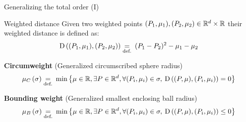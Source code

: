 \begin{frame}{Generalizing the total order (I)}
	
\scriptsize
\begin{block}{\scriptsize Weighted distance}
Given two weighted points $(P_1,\mu_1), (P_2,\mu_2) \in \mathbb{R}^d\times \mathbb{R}$ their weighted distance is defined as:
\[
\operatorname{D} \left( (P_1,\mu_1), (P_2,\mu_2) \right) \underset{\text{def.}}{=} \: (P_1-P_2)^2 - \mu_1 - \mu_2 
\]
\end{block}

\textbf{Circumweight} (Generalized circumscribed sphere radius)
\[
	\mu_C\left(\sigma \right)  \underset{\text{def.}}{=} \: \min \left\{ \mu \in \mathbb{R}, \exists P \in \mathbb{R}^d, \forall (P_i,\mu_i) \in \sigma, \: \operatorname{D} \left(  (P, \mu), (P_i, \mu_i) \right) = 0 \right\}
\]

\textbf{Bounding weight} (Generalized smallest enclosing ball radius)
\[
	\mu_B\left(\sigma \right)  \underset{\text{def.}}{=} \: \min \left\{ \mu \in \mathbb{R}, \exists P \in \mathbb{R}^d, \forall (P_i,\mu_i) \in \sigma, \: \operatorname{D} \left(  (P, \mu), (P_i, \mu_i) \right) \leq 0 \right\}
\]

\end{frame}

